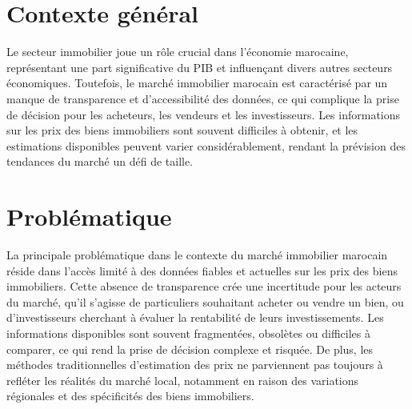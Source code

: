 \documentclass[a4paper,12pt]{report}
\numberwithin{equation}{section}
\begin{document}
\section{Contexte général}
\vspace{0.5cm}
{\large
\par Le secteur immobilier joue un rôle crucial dans l'économie marocaine, représentant une part significative du PIB et influençant divers autres secteurs économiques. Toutefois, le marché immobilier marocain est caractérisé par un manque de transparence et d'accessibilité des données, ce qui complique la prise de décision pour les acheteurs, les vendeurs et les investisseurs. Les informations sur les prix des biens immobiliers sont souvent difficiles à obtenir, et les estimations disponibles peuvent varier considérablement, rendant la prévision des tendances du marché un défi de taille. \par
}
\vspace{0.5cm}
\section{Problématique}
\vspace{0.5cm}
{\large
\par La principale problématique dans le contexte du marché immobilier marocain réside dans l'accès limité à des données fiables et actuelles sur les prix des biens immobiliers. Cette absence de transparence crée une incertitude pour les acteurs du marché, qu'il s'agisse de particuliers souhaitant acheter ou vendre un bien, ou d'investisseurs cherchant à évaluer la rentabilité de leurs investissements. Les informations disponibles sont souvent fragmentées, obsolètes ou difficiles à comparer, ce qui rend la prise de décision complexe et risquée. De plus, les méthodes traditionnelles d'estimation des prix ne parviennent pas toujours à refléter les réalités du marché local, notamment en raison des variations régionales et des spécificités des biens immobiliers.\par
}
\newpage
\vspace*{2.5cm}
\end{document}
